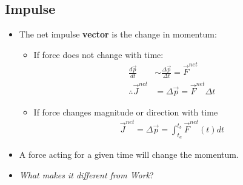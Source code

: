 \documentclass[aspectratio=169,
hyperref={colorlinks,urlcolor=blue}
]{beamer}
\begin{document}



\subsection{Impulse}
\label{subsec:impulse}
{
\vspace{-0.5cm}
\begin{itemize}
\item The net impulse \textbf{vector} is the change in momentum:
\begin{itemize}
\item If force does not change with time:
\begin{align*}
\frac{d\vec p}{dt} &\sim\frac{\Delta \vec p}{\Delta t} =\vec F^{net}\\
\therefore \vec J^{net} &= \Delta \vec p=\vec F^{net} \Delta t
\end{align*}
\item If force changes magnitude or direction with time
\begin{align*}
\vec J^{net} = \Delta \vec p = \int_{t_a}^{t_b}\vec F^{net}(t) dt
\end{align*}
\end{itemize}
\item A force acting for a given time will change the momentum.
\item \textit{What makes it different from Work}?
\end{itemize}
}
\end{document}
